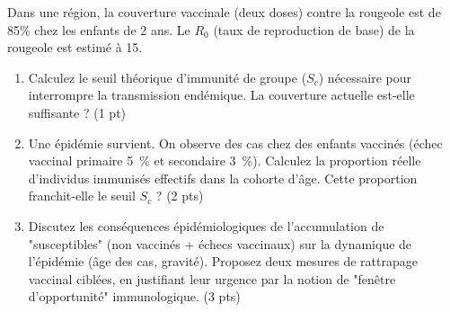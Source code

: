 \documentclass[11pt]{article}
\begin{document}
\begin{exercice}
Dans une région, la couverture vaccinale (deux doses) contre la rougeole est de 85\% chez les enfants de 2 ans. Le $R_0$ (taux de reproduction de base) de la rougeole est estimé à 15.
\begin{enumerate}
    \item Calculez le seuil théorique d'immunité de groupe ($S_c$) nécessaire pour interrompre la transmission endémique. La couverture actuelle est-elle suffisante ? (1 pt)
    \item Une épidémie survient. On observe des cas chez des enfants vaccinés (échec vaccinal primaire \SI{5}{\%} et secondaire \SI{3}{\%}). Calculez la proportion réelle d'individus immunisés effectifs dans la cohorte d'âge. Cette proportion franchit-elle le seuil $S_c$ ? (2 pts)
    \item Discutez les conséquences épidémiologiques de l'accumulation de "susceptibles" (non vaccinés + échecs vaccinaux) sur la dynamique de l'épidémie (âge des cas, gravité). Proposez deux mesures de rattrapage vaccinal ciblées, en justifiant leur urgence par la notion de "fenêtre d'opportunité" immunologique. (3 pts)
\end{enumerate}
\end{exercice}
\end{document}
